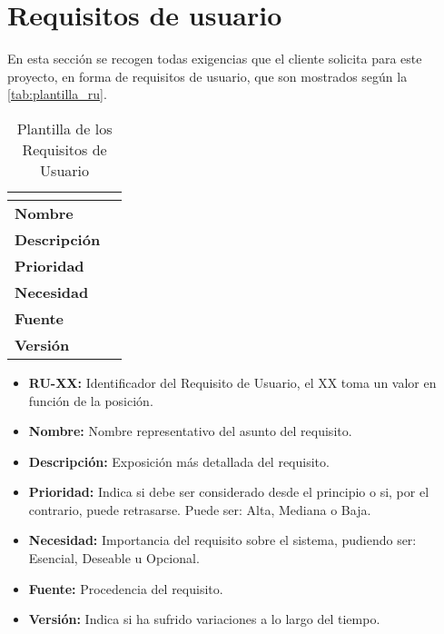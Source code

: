 \section{Requisitos de usuario}\label{sec:requisitos-de-usuario}
En esta sección se recogen todas exigencias que el cliente solicita para este proyecto, en forma de requisitos de usuario, que son mostrados según la \autoref{tab:plantilla_ru}.
\begin{table}[H]
	\centering
	\caption{Plantilla de los Requisitos de Usuario}
	\label{tab:plantilla_ru}
	\begin{tabular}{|l|p{}|}
		\hline
		\multicolumn{2}{|c|}{\cellcolor[HTML]{BFBFBF}{\color[HTML]{000000} \textbf{RU-XX}}} \\ \hline
		\textbf{Nombre}      &   \\ \hline
		\textbf{Descripción} &   \\ \hline
		\textbf{Prioridad}   &   \\ \hline
		\textbf{Necesidad}   &   \\ \hline
		\textbf{Fuente}      &   \\ \hline
		\textbf{Versión}     &   \\ \hline
	\end{tabular}
\end{table}
\begin{itemize}
	\item \textbf{RU-XX:} Identificador del Requisito de Usuario, el XX toma un valor en función de la posición.
	\item \textbf{Nombre:} Nombre representativo del asunto del requisito.
	\item \textbf{Descripción:} Exposición más detallada del requisito.
	\item \textbf{Prioridad:} Indica si debe ser considerado desde el principio o si, por el contrario, puede retrasarse. Puede ser: Alta, Mediana o Baja.
	\item \textbf{Necesidad:} Importancia del requisito sobre el sistema, pudiendo ser: Esencial, Deseable u Opcional.
	\item \textbf{Fuente:} Procedencia del requisito.
	\item \textbf{Versión:} Indica si ha sufrido variaciones a lo largo del tiempo.
\end{itemize}

